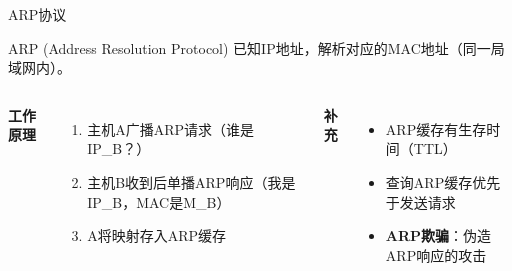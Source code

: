 \documentclass[10pt, aspectratio=169]{beamer}
\begin{document}
\begin{frame}{ARP协议}
    \begin{block}{ARP (Address Resolution Protocol)}
        已知IP地址，解析对应的MAC地址（同一局域网内）。
    \end{block}
    \vspace{0.3em}
    \begin{columns}[t]
        \textbf{工作原理}
        \begin{enumerate}
            \item 主机A广播ARP请求（谁是IP\_B？）
            \item 主机B收到后单播ARP响应（我是IP\_B，MAC是M\_B）
            \item A将映射存入ARP缓存
        \end{enumerate}
        \textbf{补充}
        \begin{itemize}
            \item ARP缓存有生存时间（TTL）
            \item 查询ARP缓存优先于发送请求
            \item \textbf{ARP欺骗}：伪造ARP响应的攻击
        \end{itemize}
    \end{columns}
    \vspace{0.3em}
    \begin{center}
    \end{center}
\end{frame}
\end{document}
